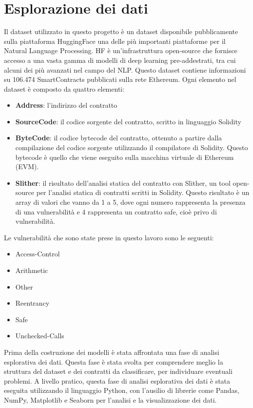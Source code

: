 \documentclass[../../Thesis.tex]{subfiles}
\begin{document}
\section{Esplorazione dei dati}
Il dataset \cite{rossini2022slitherauditedcontracts} utilizzato in questo progetto è un dataset disponibile pubblicamente sulla piattaforma HuggingFace una delle più importanti piattaforme per il Natural Language Processing. HF è un'infrastruttura open-source che fornisce accesso a una vasta gamma di modelli di deep learning pre-addestrati, tra cui alcuni dei più avanzati nel campo del NLP.
Questo dataset contiene informazioni su 106.474 SmartContracts pubblicati sulla rete Ethereum. Ogni elemento nel dataset è composto da quattro elementi:
\begin{itemize}
    \item  \textbf{Address}: l'indirizzo del contratto
    \item  \textbf{SourceCode}: il codice sorgente del contratto, scritto in linguaggio Solidity
    \item  \textbf{ByteCode}: il codice bytecode del contratto, ottenuto a partire dalla compilazione del codice sorgente utilizzando il compilatore di Solidity. Questo bytecode è quello che viene eseguito sulla macchina virtuale di Ethereum (EVM).
    \item  \textbf{Slither}: il risultato dell'analisi statica del contratto con Slither, un tool open-source per l'analisi statica di contratti scritti in Solidity. Questo risultato è un array di valori che vanno da 1 a 5, dove ogni numero  rappresenta la presenza di una vulnerabilità e 4 rappresenta un contratto safe, cioè privo di vulnerabilità.
\end{itemize}
Le vulnerabilità che sono state prese in questo lavoro sono le seguenti:
\begin{itemize}
    \item Access-Control
    \item Arithmetic
    \item Other
    \item Reentrancy
    \item Safe
    \item Unchecked-Calls
\end{itemize}
Prima della costruzione dei modelli è stata affrontata una fase di analisi esplorativa dei dati. Questa fase è stata svolta per comprendere meglio la struttura del dataset e dei contratti da classificare, per individuare eventuali problemi. A livello pratico, questa fase di analisi esplorativa dei dati è stata eseguita utilizzando il linguaggio Python, con l'ausilio di librerie come Pandas, NumPy, Matplotlib e Seaborn per l'analisi e la visualizzazione dei dati.
\end{document}
